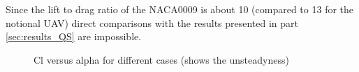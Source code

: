 
Since the lift to drag ratio of the NACA0009 is about 10 (compared to 13 for the notional UAV) direct comparisons with the results presented in part \ref{sec:results_QS} are impossible.

\begin{figure}[ht]
  \begin{center}
  \end{center}
  \caption{Cl versus alpha for different cases (shows the unsteadyness)}
  \label{fig:Cl_vs_alpha_optimization}
\end{figure}


